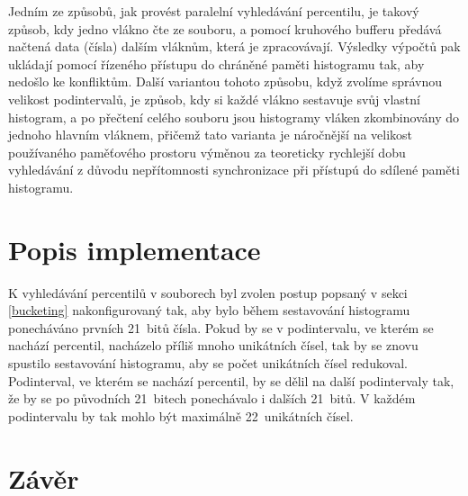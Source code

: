 \documentclass[12pt, a4paper]{article}
\newcommand{\bucketingparamone}{21}
\newcommand{\bucketingparamtwo}{21}
\newcommand{\bucketingparamthree}{22}
\let\oldsection\section
\renewcommand\section{\clearpage\oldsection}
\begin{document}
Jedním ze způsobů, jak provést paralelní vyhledávání percentilu, je takový způsob, kdy jedno vlákno čte ze souboru, a pomocí kruhového bufferu předává načtená data (čísla) dalším vláknům, která je zpracovávají. Výsledky výpočtů pak ukládají pomocí řízeného přístupu do chráněné paměti histogramu tak, aby nedošlo ke konfliktům. 
Další variantou tohoto způsobu, když zvolíme správnou velikost podintervalů, je způsob, kdy si každé vlákno sestavuje svůj vlastní histogram, a po přečtení celého souboru jsou histogramy vláken zkombinovány do jednoho hlavním vláknem, přičemž tato varianta je náročnější na velikost používaného paměťového prostoru výměnou za teoreticky rychlejší dobu vyhledávání z důvodu nepřítomnosti synchronizace při přístupú do sdílené paměti histogramu.


\section{Popis implementace}
K vyhledávání percentilů v souborech byl zvolen postup popsaný v sekci \ref{bucketing} nakonfigurovaný tak, aby bylo během sestavování histogramu ponecháváno prvních \bucketingparamone~bitů čísla.
Pokud by se v podintervalu, ve kterém se nachází percentil, nacházelo příliš mnoho unikátních čísel, tak by se znovu spustilo sestavování histogramu, aby se počet unikátních čísel redukoval. 
Podinterval, ve kterém se nachází percentil, by se dělil na další podintervaly tak, že by se po původních \bucketingparamone~bitech ponechávalo i dalších \bucketingparamtwo~bitů. 
V každém podintervalu by tak mohlo být maximálně \bucketingparamthree~unikátních čísel.


\section{Závěr}
\end{document}
